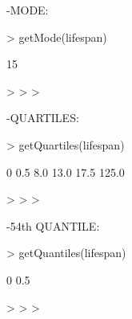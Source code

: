 \documentclass[a4paper]{article}
\begin{document}
-MODE:



\begin{Schunk}
\begin{Sinput}
> getMode(lifespan)
\end{Sinput}
\begin{Soutput}
[1] 15
\end{Soutput}
\begin{Sinput}
> 
> 
> 
\end{Sinput}
\end{Schunk}



-QUARTILES:



\begin{Schunk}
\begin{Sinput}
> getQuartiles(lifespan)
\end{Sinput}
\begin{Soutput}
   0%   25%   50%   75%  100% 
  0.5   8.0  13.0  17.5 125.0 
\end{Soutput}
\begin{Sinput}
> 
> 
> 
\end{Sinput}
\end{Schunk}



-54th QUANTILE:



\begin{Schunk}
\begin{Sinput}
> getQuantiles(lifespan)
\end{Sinput}
\begin{Soutput}
 0% 
0.5 
\end{Soutput}
\begin{Sinput}
> 
> 
> 
\end{Sinput}
\end{Schunk}
\end{document}
